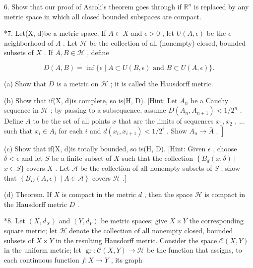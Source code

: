 6. Show that our proof of Ascoli’s theorem goes through if \({\mathbb{R}}^{n}\) is replaced by any metric space in which all closed bounded subspaces are compact.

*7. Let(X, d)be a metric space. If \(A \subset  X\) and \(\epsilon  > 0\) , let \(U\left( {A,\epsilon }\right)\) be the \(\epsilon\) - neighborhood of \(A\) . Let \(\mathcal{H}\) be the collection of all (nonempty) closed, bounded subsets of \(X\) . If \(A,B \in  \mathcal{H}\) , define

\[
D\left( {A,B}\right)  = \inf \{ \epsilon  \mid  A \subset  U\left( {B,\epsilon }\right) \text{ and }B \subset  U\left( {A,\epsilon }\right) \} .
\]

(a) Show that \(D\) is a metric on \(\mathcal{H}\) ; it is called the Hausdorff metric.

(b) Show that if(X, d)is complete, so is(H, D). [Hint: Let \({A}_{n}\) be a Cauchy sequence in \(\mathcal{H}\) ; by passing to a subsequence, assume \(D\left( {{A}_{n},{A}_{n + 1}}\right)  < 1/{2}^{n}\) . Define \(A\) to be the set of all points \(x\) that are the limits of sequences \({x}_{1},{x}_{2}\) , ... such that \({x}_{i} \in  {A}_{i}\) for each \(i\) and \(d\left( {{x}_{i},{x}_{i + 1}}\right)  < 1/{2}^{i}\) . Show \(\left. {{A}_{n} \rightarrow  \bar{A}\text{ . }}\right\rbrack\)

(c) Show that if(X, d)is totally bounded, so is(H, D). [Hint: Given \(\epsilon\) , choose \(\delta  < \epsilon\) and let \(S\) be a finite subset of \(X\) such that the collection \(\left\{  {{B}_{d}\left( {x,\delta }\right)  \mid  }\right.\)  \(x \in  S\}\) covers \(X\) . Let \(\mathcal{A}\) be the collection of all nonempty subsets of \(S\) ; show that \(\left\{  {{B}_{D}\left( {A,\epsilon }\right)  \mid  A \in  \mathcal{A}}\right\}\) covers \(\mathcal{H}\) .]

(d) Theorem. If \(X\) is compact in the metric \(d\) , then the space \(\mathcal{H}\) is compact in the Hausdorff metric \(D\) .

*8. Let \(\left( {X,{d}_{X}}\right)\) and \(\left( {Y,{d}_{Y}}\right)\) be metric spaces; give \(X \times  Y\) the corresponding square metric; let \(\mathcal{H}\) denote the collection of all nonempty closed, bounded subsets of \(X \times  Y\) in the resulting Hausdorff metric. Consider the space \(\mathcal{C}\left( {X,Y}\right)\) in the uniform metric; let \(\operatorname{gr} : \mathcal{C}\left( {X,Y}\right)  \rightarrow  \mathcal{H}\) be the function that assigns, to each continuous function \(f : X \rightarrow  Y\) , its graph

